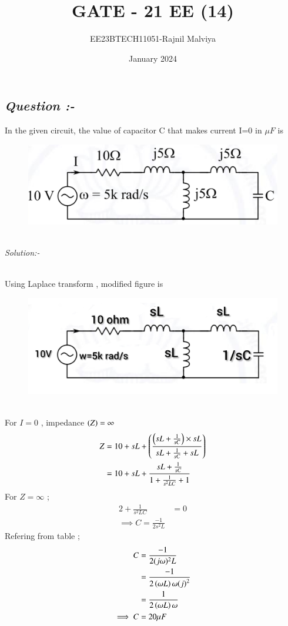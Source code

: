 \documentclass[journal,12pt,twocolumn]{IEEEtran}
\theoremstyle{remark}
\begin{document}
\title{GATE - 21 EE (14)}
\author{EE23BTECH11051-Rajnil Malviya}
\date{January 2024}
\maketitle
\subsection*{\textit{Question :-}}
In the given circuit, the value of capacitor C that makes current
I=0 in $\mu F$ is \\
\begin{figure}[h!]
   \includegraphics[width=1\linewidth]{figs/qf1.png}
\end{figure}\\
\textit{Solution:- }
\begin{table}[h!]
            
    \end{table}\\
Using Laplace transform , modified figure is 
\begin{figure}[h!]
   \includegraphics[width=1\linewidth]{figs/f2.jpg}
\end{figure}\\
For $I=0 $ , impedance $\left(Z\right) =\infty$
\begin{align}
    Z&=10+sL+\left(\frac{\left(sL+\frac{1}{sC}\right)\times sL}{sL+\frac{1}{sC}+ sL}\right)\\
&=10+sL+\frac{sL+\frac{1}{sC}}{1+\frac{1}{s^{2}LC}+1}
\end{align}
For $Z=\infty$ ;
\begin{align}
    2+\frac{1}{s^{2}LC}&=0 \\
    \implies C=\frac{-1}{2s^2L}
\end{align}
Refering from table ;
\begin{align}
     C&=\frac{-1}{2(j\omega)^2L}\\
      &=\frac{-1}{2\left(\omega L\right)\omega {\ensuremath{\left(j\right)}}^2}\\
       &=\frac{1}{2\left(\omega L\right)\omega }\\
       \implies C&= 20\mu F
\end{align}
\end{document}

